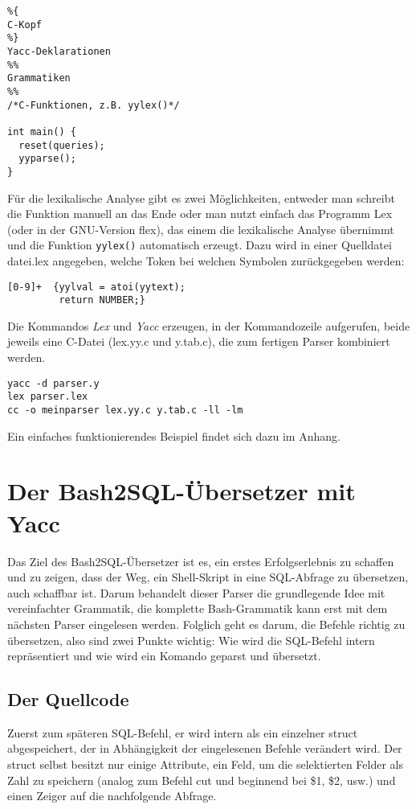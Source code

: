 \begin{lstlisting}
%{
C-Kopf
%}
Yacc-Deklarationen
%%
Grammatiken
%%
/*C-Funktionen, z.B. yylex()*/

int main() {
  reset(queries);
  yyparse();
}
\end{lstlisting}

Für die lexikalische Analyse gibt es zwei Möglichkeiten, entweder man schreibt die Funktion manuell an das Ende oder man nutzt einfach das Programm Lex (oder in der GNU-Version flex), das einem die lexikalische Analyse übernimmt und die Funktion \lstinline{yylex()} automatisch erzeugt. Dazu wird in einer Quelldatei datei.lex angegeben, welche Token bei welchen Symbolen zurückgegeben werden:\cite{meinders}

\begin{lstlisting}
[0-9]+  {yylval = atoi(yytext);
         return NUMBER;}
\end{lstlisting}

Die Kommandos \textit{Lex} und \textit{Yacc} erzeugen, in der Kommandozeile aufgerufen, beide jeweils eine C-Datei (lex.yy.c und y.tab.c), die zum fertigen Parser kombiniert werden.

\begin{lstlisting}
yacc -d parser.y
lex parser.lex
cc -o meinparser lex.yy.c y.tab.c -ll -lm
\end{lstlisting}

Ein einfaches funktionierendes Beispiel findet sich dazu im Anhang.

\section{Der Bash2SQL-Übersetzer mit Yacc}
Das Ziel des Bash2SQL-Übersetzer ist es, ein erstes Erfolgserlebnis zu schaffen und zu zeigen, dass der Weg, ein Shell-Skript in eine SQL-Abfrage zu übersetzen, auch schaffbar ist. Darum behandelt dieser Parser die grundlegende Idee mit vereinfachter Grammatik, die komplette Bash-Grammatik kann erst mit dem nächsten Parser eingelesen werden.
Folglich geht es darum, die Befehle richtig zu übersetzen, also sind zwei Punkte wichtig: Wie wird die SQL-Befehl intern repräsentiert und wie wird ein Komando geparst und übersetzt.
\subsection{Der Quellcode}
Zuerst zum späteren SQL-Befehl, er wird intern als ein einzelner struct abgespeichert, der in Abhängigkeit der eingelesenen Befehle verändert wird. Der struct selbst besitzt nur einige Attribute, ein Feld, um die selektierten Felder als Zahl zu speichern (analog zum Befehl cut und beginnend bei \$1, \$2, usw.) und einen Zeiger auf die nachfolgende Abfrage.

